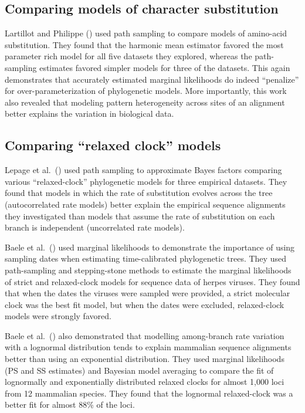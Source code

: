 \subsection{Comparing models of character substitution}

Lartillot and Philippe (\citeyear{Lartillot2006}) used path sampling to compare
models of amino-acid substitution.
They found that the harmonic mean estimator favored the most parameter rich
model for all five datasets they explored, whereas the path-sampling estimates
favored simpler models for three of the datasets.
This again demonstrates that accurately estimated marginal likelihoods do
indeed ``penalize'' for over-parameterization of phylogenetic models.
More importantly, this work also revealed that modeling pattern heterogeneity
across sites of an alignment better explains the variation in biological data.

\subsection{Comparing ``relaxed clock'' models}

Lepage et al.\ (\citeyear{Lepage2007}) used path sampling to approximate Bayes
factors comparing various ``relaxed-clock'' phylogenetic models for
three empirical datasets.
They found that models in which the rate of substitution evolves across the tree
(autocorrelated rate models) better explain the empirical sequence alignments
they investigated than models that assume the rate of substitution on each
branch is independent (uncorrelated rate models).

Baele et al.\ (\citeyear{Baele2012}) used marginal likelihoods to demonstrate
the importance of using sampling dates when estimating time-calibrated
phylogenetic trees.
They used path-sampling and stepping-stone methods to estimate the marginal
likelihoods of strict and relaxed-clock models for sequence data of herpes
viruses.
They found that when the dates the viruses were sampled were provided, a strict
molecular clock was the best fit model, but when the dates were excluded,
relaxed-clock models were strongly favored.

Baele et al.\ (\citeyear{Baele2012}) also demonstrated that modelling
among-branch rate variation with a lognormal distribution tends to explain
mammalian sequence alignments better than using an exponential distribution.
They used marginal likelihoods (PS and SS estimates) and Bayesian model
averaging to compare the fit of lognormally and exponentially distributed
relaxed clocks for almost 1,000 loci from 12 mammalian species.
They found that the lognormal relaxed-clock was a better fit for almost 88\% of
the loci.

